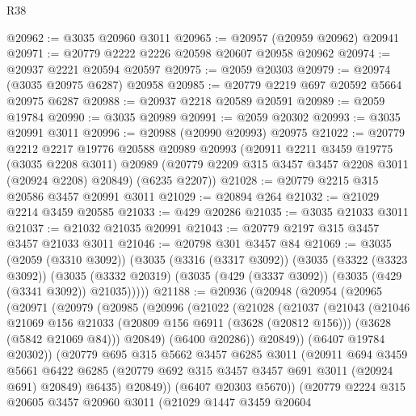 \begin{lexlean}{R38}
\begin{coremodule}
@20962 := @3035 @20960 @3011
@20965 := @20957 (@20959 @20962) @20941
@20971 := @20779 @2222 @2226 @20598 @20607 @20958 @20962
@20974 := @20937 @2221 @20594 @20597
@20975 := @2059 @20303
@20979 := @20974 (@3035 @20975 @6287) @20958
@20985 := @20779 @2219 @697 @20592 @5664 @20975 @6287
@20988 := @20937 @2218 @20589 @20591
@20989 := @2059 @19784
@20990 := @3035 @20989
@20991 := @2059 @20302
@20993 := @3035 @20991 @3011
@20996 := @20988 (@20990 @20993) @20975
@21022 := @20779
    @2212
    @2217
    @19776
    @20588
    @20989
    @20993
    (@20911
      @2211
      @3459
      @19775
      (@3035 @2208 @3011)
      @20989
      (@20779 @2209 @315 @3457 @3457 @2208 @3011 (@20924 @2208) @20849)
      (@6235 @2207))
@21028 := @20779 @2215 @315 @20586 @3457 @20991 @3011
@21029 := @20894 @264
@21032 := @21029 @2214 @3459 @20585
@21033 := @429 @20286
@21035 := @3035 @21033 @3011
@21037 := @21032 @21035 @20991
@21043 := @20779 @2197 @315 @3457 @3457 @21033 @3011
@21046 := @20798 @301 @3457 @84
@21069 := @3035
    (@2059 (@3310 @3092))
    (@3035
      (@3316 (@3317 @3092))
      (@3035
        (@3322 (@3323 @3092))
        (@3035 (@3332 @20319) (@3035 (@429 (@3337 @3092)) (@3035 (@429 (@3341 @3092)) @21035)))))
@21188 := @20936
    (@20948
      (@20954
        (@20965
          (@20971
            (@20979
              (@20985
                (@20996
                  (@21022
                    (@21028
                      (@21037
                        (@21043
                          (@21046
                            @21069
                            @156
                            @21033
                            (@20809 @156 @6911 (@3628 (@20812 @156)))
                            (@3628 (@5842 @21069 @84)))
                          @20849)
                        (@6400 @20286))
                      @20849))
                  (@6407 @19784 @20302))
                (@20779
                  @695
                  @315
                  @5662
                  @3457
                  @6285
                  @3011
                  (@20911
                    @694
                    @3459
                    @5661
                    @6422
                    @6285
                    (@20779 @692 @315 @3457 @3457 @691 @3011 (@20924 @691) @20849)
                    @6435)
                  @20849))
              (@6407 @20303 @5670))
            (@20779
              @2224
              @315
              @20605
              @3457
              @20960
              @3011
              (@21029
                @1447
                @3459
                @20604

\end{coremodule}
\end{lexlean}
